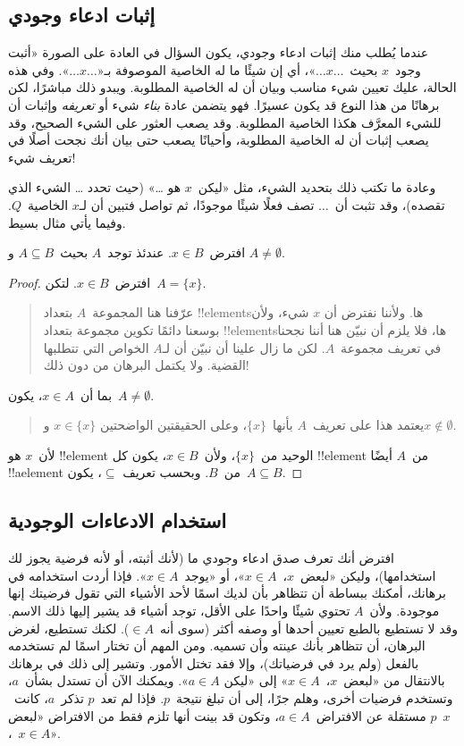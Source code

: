 \documentclass[../../../include/open-logic-section]{subfiles}
\begin{document}
\subsection{إثبات ادعاء وجودي}

عندما يُطلب منك إثبات ادعاء وجودي، يكون السؤال في العادة على الصورة
«أثبت وجود~$x$ بحيث~$\dots x \dots$»، أي إن شيئًا ما له الخاصية
الموصوفة بـ«$\dots x \dots$». وفي هذه الحالة، عليك تعيين شيء مناسب
وبيان أن له الخاصية المطلوبة. ويبدو ذلك مباشرًا، لكن برهانًا من هذا
النوع قد يكون عسيرًا. فهو يتضمن عادة \emph{بناء} شيء أو \emph{تعريفه}
وإثبات أن للشيء المعرَّف هكذا الخاصية المطلوبة. وقد يصعب العثور على
الشيء الصحيح، وقد يصعب إثبات أن له الخاصية المطلوبة، وأحيانًا يصعب
حتى بيان أنك نجحت أصلًا في تعريف شيء!{}

وعادة ما تكتب ذلك بتحديد الشيء، مثل «ليكن~$x$ هو \dots» (حيث تحدد
\dots{} الشيء الذي تقصده)، وقد تثبت أن~$\dots$ تصف فعلًا شيئًا
موجودًا، ثم تواصل فتبين أن لـ$x$ الخاصية~$Q$. وفيما يأتي مثال بسيط.

\begin{prop}
  افترض~$x \in B$. عندئذ توجد~$A$ بحيث~$A \subseteq B$ و
  $A \neq \emptyset$.
\end{prop}

\begin{proof}
  افترض~$x \in B$. لتكن~$A = \{x\}$.
  \begin{quote}
    عرّفنا هنا المجموعة~$A$ بتعداد !!{element}sها. ولأننا نفترض أن
    $x$ شيء، ولأن بوسعنا دائمًا تكوين مجموعة بتعداد !!{element}sها،
    فلا يلزم أن نبيّن هنا أننا نجحنا في تعريف مجموعة~$A$. لكن ما زال
    علينا أن نبيّن أن لـ$A$ الخواص التي تتطلبها القضية. ولا يكتمل
    البرهان من دون ذلك!{}
  \end{quote}
  بما أن~$x \in A$، يكون~$A \neq \emptyset$.
  \begin{quote}
    يعتمد هذا على تعريف~$A$ بأنها~$\{x\}$، وعلى الحقيقتين الواضحتين
    $x \in \{x\}$ و$x \notin \emptyset$.
  \end{quote}
  لأن~$x$ هو !!{element} الوحيد من~$\{x\}$، ولأن~$x \in B$، يكون كل
  !!{element} من~$A$ أيضًا !!a{element} من~$B$. وبحسب تعريف
  $\subseteq$، يكون~$A \subseteq B$.
\end{proof}

\subsection{استخدام الادعاءات الوجودية}

افترض أنك تعرف صدق ادعاء وجودي ما (لأنك أثبته، أو لأنه فرضية يجوز لك
استخدامها)، وليكن «لبعض~$x$،~$x \in A$»، أو «يوجد~$x \in A$». فإذا
أردت استخدامه في برهانك، أمكنك ببساطة أن تتظاهر بأن لديك اسمًا لأحد
الأشياء التي تقول فرضيتك إنها موجودة. ولأن~$A$ تحتوي شيئًا واحدًا على
الأقل، توجد أشياء قد يشير إليها ذلك الاسم. وقد لا تستطيع بالطبع
تعيين أحدها أو وصفه أكثر (سوى أنه~$\in A$). لكنك تستطيع، لغرض
البرهان، أن تتظاهر بأنك عينته وأن تسميه. ومن المهم أن تختار اسمًا لم
تستخدمه بالفعل (ولم يرد في فرضياتك)، وإلا فقد تختل الأمور. وتشير إلى
ذلك في برهانك بالانتقال من «لبعض~$x$،~$x \in A$» إلى «ليكن
$a \in A$». ويمكنك الآن أن تستدل بشأن~$a$، وتستخدم فرضيات أخرى، وهلم
جرًا، إلى أن تبلغ نتيجة~$p$. فإذا لم تعد~$p$ تذكر~$a$، كانت~$p$
مستقلة عن الافتراض~$a \in A$، وتكون قد بينت أنها تلزم فقط من الافتراض
«لبعض~$x$،~$x \in A$».
\end{document}
